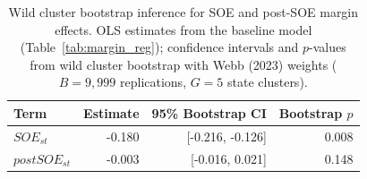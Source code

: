 \begin{table}[!h]
\centering
\caption{\label{tab:tab:margin_wcb}Wild cluster bootstrap inference for SOE and post-SOE margin effects. OLS estimates from the baseline model (Table~\ref{tab:margin_reg}); confidence intervals and $p$-values from wild cluster bootstrap with Webb (2023) weights ($B = 9{,}999$ replications, $G = 5$ state clusters).}
\centering
\begin{tabular}[t]{lrrr}
\toprule
Term & Estimate & 95\% Bootstrap CI & Bootstrap $p$\\
\midrule
$SOE_{st}$ & -0.180 & {}[-0.216, -0.126] & 0.008\\
$postSOE_{st}$ & -0.003 & {}[-0.016, 0.021] & 0.148\\
\bottomrule
\end{tabular}
\end{table}
